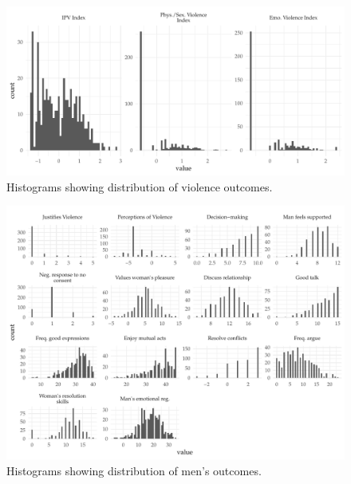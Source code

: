 \documentclass[11pt,english]{article}
\begin{document}
\begin{figure}[H]
\centering
\includegraphics[width = \textwidth]{figures/distribution_violence.pdf}
\caption{Histograms showing distribution of violence outcomes.}
\label{fig:dist_violence}
\end{figure}

\begin{figure}[H]
\centering
\includegraphics[width = \textwidth]{figures/distribution_mens.pdf}
\caption{Histograms showing distribution of men's outcomes.}
\label{fig:dist_mens}
\end{figure}
\end{document}
